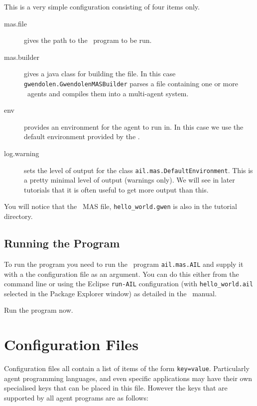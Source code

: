 This is a very simple configuration consisting of four items only.
\begin{description}
\item[mas.file] gives the path to the \gwendolen\ program to be run.
\item[mas.builder] gives a java class for building the file.  In this case \texttt{gwendolen.GwendolenMASBuilder} parses a file containing one or more \gwendolen\ agents and compiles them into a multi-agent system.
\item[env] provides an environment for the agent to run in.  In this case we use the default environment provided by the \ail.
\item[log.warning] sets the level of output for the class \texttt{ail.mas.DefaultEnvironment}.  This is a pretty minimal level of output (warnings only).  We will see in later tutorials that it is often useful to get more output than this.
\end{description}
You will notice that the \gwendolen\ MAS file, \texttt{hello\_world.gwen} is also in the tutorial directory.

\subsection{Running the Program}

To run the program you need to run the \java\ program \texttt{ail.mas.AIL} and supply it with a the configuration file as an argument.  You can do this either from the command line or using the Eclipse \texttt{run-AIL} configuration (with \texttt{hello\_world.ail} selected in the Package Explorer window) as detailed in the \mcapl\ manual.

Run the program now.

\section{Configuration Files}

Configuration files all contain a list of items of the form \texttt{key=value}.  Particularly agent programming languages, and even specific applications may have their own specialised keys that can be placed in this file.  However the keys that are supported by all agent programs are as follows:

